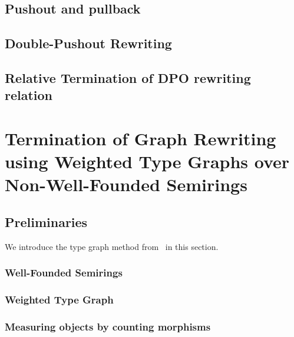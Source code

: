 \documentclass{report}
\begin{document}
\section{Pushout and pullback}  
\label{Preliminaries:Pushout}

\section{Double-Pushout Rewriting} 
\label{sec:dpo}
 
\section{Relative Termination of DPO rewriting relation} 
\label{sec:relative_termination}


\chapter{Termination of Graph Rewriting using Weighted Type Graphs over Non-Well-Founded Semirings} 
\label{chap:nwf}



\section{Preliminaries}
\label{sec:type_graph:preliminaries}
We introduce the type graph method from~\cite{endrullis2024generalized_icgt} in this section.
\subsection{Well-Founded Semirings} 
\label{sec:well_founded_semiring}

 
\subsection{Weighted Type Graph} 
\label{sec:weighted_type_graph}


\subsection{Measuring objects by counting morphisms}
\label{sec:type_graph:wf:measuring_graphs}

  
\end{document}
